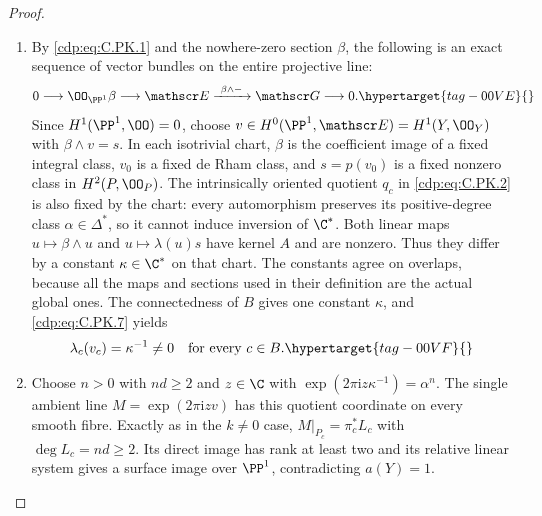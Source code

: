 \begin{proof}
\begin{enumerate}[leftmargin=*]
\item By \eqref{cdp:eq:C.PK.1} and the nowhere-zero section $\beta$, the
following is an exact sequence of vector bundles on the
entire projective line:
\begin{equation}
 0\longrightarrow\OO_{\PP^1}\beta
  \longrightarrow\mathscr E
  \xrightarrow{\ \beta\wedge-\ }\mathscr G
  \longrightarrow0.
\hypertarget{tag-00VE}{}\label{cdp:eq:C.PK.7}
\end{equation}
Since $H^1(\PP^1,\OO)=0$, choose
$v\in H^0(\PP^1,\mathscr E)=H^1(Y,\OO_Y)$ with
$\beta\wedge v=s$.
In each isotrivial chart,
$\beta$ is the coefficient image of a fixed integral
class, $v_0$ is a fixed de Rham class, and $s=p(v_0)$
is a fixed nonzero class in $H^2(P,\OO_P)$.
The intrinsically oriented quotient $q_c$ in \eqref{cdp:eq:C.PK.2} is also fixed
by the chart: every automorphism preserves its
positive-degree class $\alpha\in\Delta^*$, so it cannot
induce inversion of $\C^*$.
Both linear maps $u\mapsto\beta\wedge u$ and
$u\mapsto\lambda(u)s$ have kernel $A$ and are nonzero.
Thus they differ by a constant $\kappa\in\C^*$ on
that chart. The constants agree on overlaps, because
all the maps and sections used in their definition are
the actual global ones. The connectedness of $B$ gives
one constant $\kappa$, and \eqref{cdp:eq:C.PK.7} yields
\begin{equation}
 \lambda_c(v_c)=\kappa^{-1}\ne0
 \quad\hbox{for every }c\in B.
\hypertarget{tag-00VF}{}\label{cdp:eq:C.PK.8}
\end{equation}

\item Choose $n>0$ with $nd\ge2$ and $z\in\C$ with
$\exp(2\pi\mathrm i z\kappa^{-1})=\alpha^n$.
The single ambient line $M=\exp(2\pi\mathrm i z v)$
has this quotient coordinate on every smooth fibre.
Exactly as in the $k\ne0$ case,
$M|_{P_c}=\pi_c^*L_c$ with $\deg L_c=nd\ge2$.
Its direct image has rank at least two and its relative
linear system gives a surface image over $\PP^1$,
contradicting $a(Y)=1$.

\end{enumerate}
\end{proof}